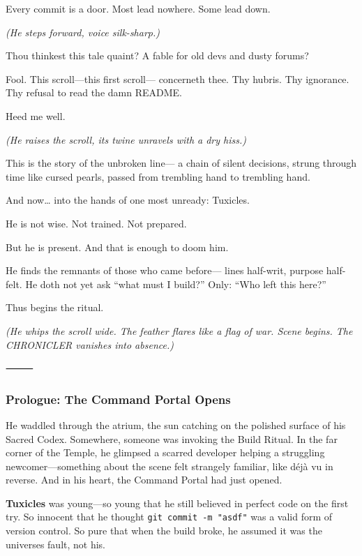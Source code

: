 Every commit is a door. Most lead nowhere. Some lead down.

\emph{(He steps forward, voice silk-sharp.)}

Thou thinkest this tale quaint? A fable for old devs and dusty forums?

Fool. This scroll---this first scroll--- concerneth thee. Thy hubris. Thy ignorance. Thy refusal to read the damn README.

Heed me well.

\emph{(He raises the scroll, its twine unravels with a dry hiss.)}

This is the story of the unbroken line--- a chain of silent decisions, strung through time like cursed pearls, passed from trembling hand to trembling hand.

And now\ldots{} into the hands of one most unready: Tuxicles.

He is not wise. Not trained. Not prepared.

But he is present. And that is enough to doom him.

He finds the remnants of those who came before--- lines half-writ, purpose half-felt. He doth not yet ask ``what must I build?'' Only: ``Who left this here?''

Thus begins the ritual.

\emph{(He whips the scroll wide. The feather flares like a flag of war. Scene begins. The CHRONICLER vanishes into absence.)}

⸻

\subsubsection{Prologue: The Command Portal Opens}\label{prologue-the-command-portal-opens}

He waddled through the atrium, the sun catching on the polished surface of his Sacred Codex. Somewhere, someone was invoking the Build Ritual. In the far corner of the Temple, he glimpsed a scarred developer helping a struggling newcomer---something about the scene felt strangely familiar, like déjà vu in reverse. And in his heart, the Command Portal had just opened.

\textbf{Tuxicles} was young---so young that he still believed in perfect code on the first try. So innocent that he thought \texttt{git\ commit\ -m\ "asdf"} was a valid form of version control. So pure that when the build broke, he assumed it was the universe\textquotesingle s fault, not his.

